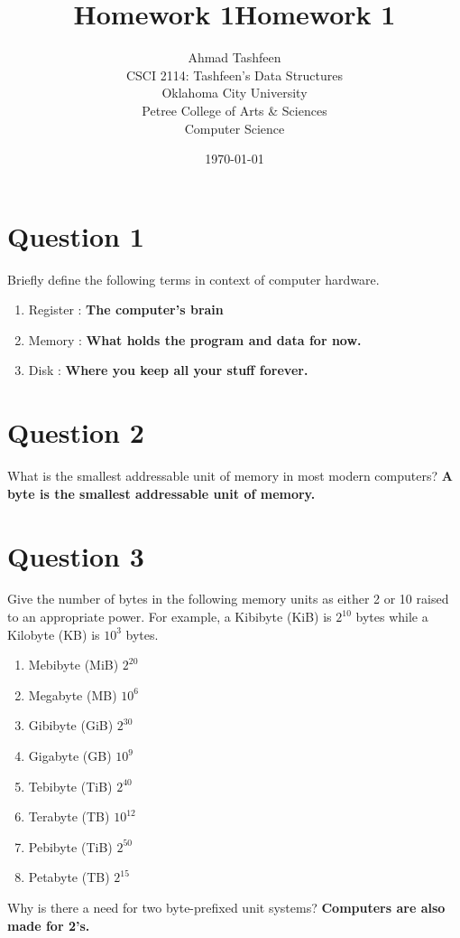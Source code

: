 \documentclass{article}
\title{Homework 1}
\author{Ahmad Tashfeen \\ CSCI 2114: Tashfeen's Data Structures \\ Oklahoma City University \\ Petree College of Arts \& Sciences \\ Computer Science}
\date{\today}
\title{Homework 1}
\begin{document}
\maketitle

\section*{Question 1} Briefly define the following terms in context of computer
hardware.

\begin{enumerate}
  \item Register :\textbf{ The computer's brain  }
  \item Memory : \textbf{What holds the program and data for now. } 
  \item Disk : \textbf{Where you keep all your stuff forever. }
\end{enumerate}

\section*{Question 2} What is the smallest addressable unit of memory in most modern
computers?
\textbf{A byte is the smallest addressable unit of memory. }

\section {Question 3} Give the number of bytes in the following memory units as either 2
or 10 raised to an appropriate power. For example, a Kibibyte
(KiB) is $2^{10}$ bytes while a Kilobyte (KB) is $10^3$ bytes.

\begin{enumerate} [label=\alph*]
  \item Mebibyte (MiB) $2^{20}$
  \item Megabyte (MB) $10^6$
  \item Gibibyte (GiB) $2^{30}$
  \item Gigabyte (GB) $10^9$
  \item Tebibyte (TiB) $2^{40}$
  \item Terabyte (TB) $10^{12}$
  \item Pebibyte (TiB) $2^{50}$
  \item Petabyte (TB) $2^{15}$
\end{enumerate}

Why is there a need for two byte-prefixed unit systems?
\textbf{Computers are also made for 2's. }
\end{document}
